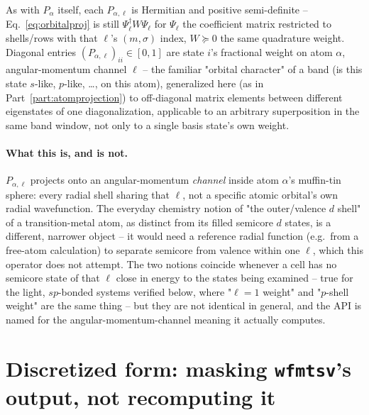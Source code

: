 \documentclass[11pt]{article}
\begin{document}
As with $P_\alpha$ itself, each $P_{\alpha,\ell}$ is Hermitian and positive
semi-definite -- Eq.~\eqref{eq:orbitalproj} is still $\Psi_\ell^\dagger W \Psi_\ell$ for
$\Psi_\ell$ the coefficient matrix restricted to shells/rows with that $\ell$'s
$(m,\sigma)$ index, $W\succeq0$ the same quadrature weight. Diagonal entries
$(P_{\alpha,\ell})_{ii}\in[0,1]$ are state $i$'s fractional weight on atom $\alpha$,
angular-momentum channel $\ell$ -- the familiar "orbital character" of a band (is this
state $s$-like, $p$-like, \ldots, on this atom), generalized here (as in
Part~\ref{part:atomprojection}) to off-diagonal matrix elements between different
eigenstates of one diagonalization, applicable to an arbitrary superposition in the same
band window, not only to a single basis state's own weight.

\paragraph{What this is, and is not.} $P_{\alpha,\ell}$ projects onto an
angular-momentum \emph{channel} inside atom $\alpha$'s muffin-tin sphere: every radial
shell sharing that $\ell$, not a specific atomic orbital's own radial wavefunction. The
everyday chemistry notion of "the outer/valence $d$ shell" of a transition-metal atom, as
distinct from its filled semicore $d$ states, is a different, narrower object -- it would
need a reference radial function (e.g.\ from a free-atom calculation) to separate
semicore from valence within one $\ell$, which this operator does not attempt. The two
notions coincide whenever a cell has no semicore state of that $\ell$ close in energy to
the states being examined -- true for the light, $sp$-bonded systems verified below, where
"$\ell=1$ weight" and "$p$-shell weight" are the same thing -- but they are not identical
in general, and the API is named for the angular-momentum-channel meaning it actually
computes.

\section{Discretized form: masking \texttt{wfmtsv}'s output, not recomputing it}
\end{document}
